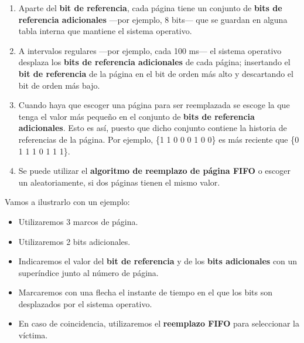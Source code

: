 \begin{enumerate}
\def\labelenumi{\arabic{enumi}.}
\item
  Aparte del \textbf{bit de referencia}, cada página tiene un conjunto
  de \textbf{bits de referencia adicionales} ---por ejemplo, 8 bits---
  que se guardan en alguna tabla interna que mantiene el sistema
  operativo.
\item
  A intervalos regulares ---por ejemplo, cada 100 ms--- el sistema
  operativo desplaza los \textbf{bits de referencia adicionales} de cada
  página; insertando el \textbf{bit de referencia} de la página en el
  bit de orden más alto y descartando el bit de orden más bajo.
\item
  Cuando haya que escoger una página para ser reemplazada se escoge la
  que tenga el valor más pequeño en el conjunto de \textbf{bits de
  referencia adicionales}. Esto es así, puesto que dicho conjunto
  contiene la historia de referencias de la página. Por ejemplo, \{1 1 0
  0 0 1 0 0\} es más reciente que \{0 1 1 1 0 1 1 1\}.
\item
  Se puede utilizar el \textbf{algoritmo de reemplazo de página FIFO} o
  escoger un aleatoriamente, si dos páginas tienen el mismo valor.
\end{enumerate}

Vamos a ilustrarlo con un ejemplo:

\begin{itemize}
\item
  Utilizaremos 3 marcos de página.
\item
  Utilizaremos 2 bits adicionales.
\item
  Indicaremos el valor del \textbf{bit de referencia} y de los
  \textbf{bits adicionales} con un superíndice junto al número de
  página.
\item
  Marcaremos con una flecha el instante de tiempo en el que los bits son
  desplazados por el sistema operativo.
\item
  En caso de coincidencia, utilizaremos el \textbf{reemplazo FIFO} para
  seleccionar la víctima.
\end{itemize}


